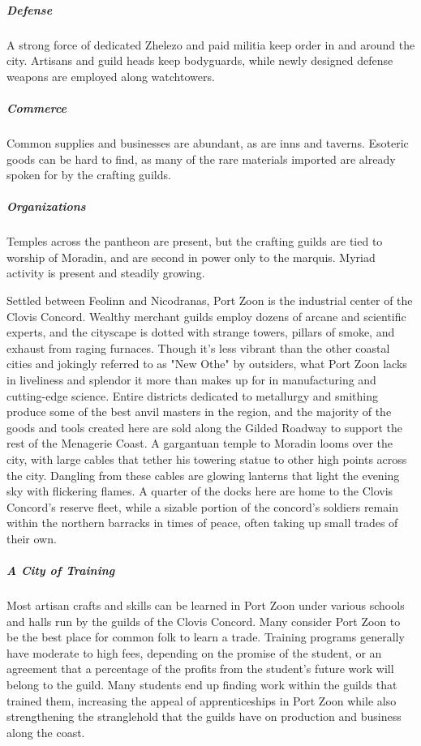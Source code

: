 \documentclass[10pt,a4paper,twoside,bg=print,twocolumn,openany,nodeprecatedcode]{dndbook}
\begin{document}
\subparagraph{Defense}
A strong force of dedicated Zhelezo and paid militia keep order in and around the city. Artisans and guild heads keep bodyguards, while newly designed defense weapons are employed along watchtowers.

\subparagraph{Commerce}
Common supplies and businesses are abundant, as are inns and taverns. Esoteric goods can be hard to find, as many of the rare materials imported are already spoken for by the crafting guilds.

\subparagraph{Organizations}
Temples across the pantheon are present, but the crafting guilds are tied to worship of Moradin, and are second in power only to the marquis. Myriad activity is present and steadily growing.

Settled between Feolinn and Nicodranas, Port Zoon is the industrial center of the Clovis Concord. Wealthy merchant guilds employ dozens of arcane and scientific experts, and the cityscape is dotted with strange towers, pillars of smoke, and exhaust from raging furnaces. Though it's less vibrant than the other coastal cities and jokingly referred to as "New Othe" by outsiders, what Port Zoon lacks in liveliness and splendor it more than makes up for in manufacturing and cutting-edge science. Entire districts dedicated to metallurgy and smithing produce some of the best anvil masters in the region, and the majority of the goods and tools created here are sold along the Gilded Roadway to support the rest of the Menagerie Coast. A gargantuan temple to Moradin looms over the city, with large cables that tether his towering statue to other high points across the city. Dangling from these cables are glowing lanterns that light the evening sky with flickering flames. A quarter of the docks here are home to the Clovis Concord's reserve fleet, while a sizable portion of the concord's soldiers remain within the northern barracks in times of peace, often taking up small trades of their own.

\subparagraph{A City of Training}
Most artisan crafts and skills can be learned in Port Zoon under various schools and halls run by the guilds of the Clovis Concord. Many consider Port Zoon to be the best place for common folk to learn a trade. Training programs generally have moderate to high fees, depending on the promise of the student, or an agreement that a percentage of the profits from the student's future work will belong to the guild. Many students end up finding work within the guilds that trained them, increasing the appeal of apprenticeships in Port Zoon while also strengthening the stranglehold that the guilds have on production and business along the coast.
\end{document}
